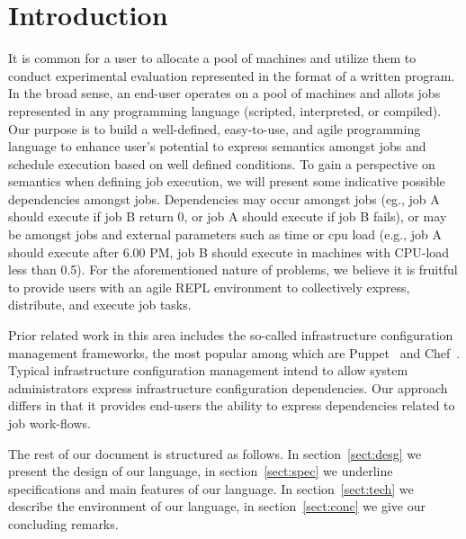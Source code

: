 \section{Introduction}
\label{sect:intro}

It is common for a user to allocate a pool of machines and utilize
them to conduct experimental evaluation represented in the format of
a written program. In the broad sense, an end-user operates on a
pool of machines and allots jobs represented in any programming
language (scripted, interpreted, or compiled). Our purpose is to
build a well-defined, easy-to-use, and agile programming language
to enhance user's potential to express semantics amongst jobs and 
schedule execution based on well defined conditions. To gain a 
perspective on semantics when  defining job  execution, we will 
present some indicative possible dependencies amongst jobs. 
Dependencies may occur amongst jobs (eg., job A should execute if 
job B return 0, or job A should execute if job B fails), or may be 
amongst jobs and external parameters such as time or cpu load (e.g., 
job A should execute after 6.00 PM, job B should execute in machines 
with CPU-load less than 0.5). For the aforementioned nature of 
problems, we believe it is fruitful to provide users with an agile 
REPL environment to collectively express, distribute, and execute 
job tasks.

Prior related work in this area includes the so-called infrastructure 
configuration management frameworks, the most popular among which are 
Puppet~\cite{puppet} and Chef~\cite{chef}. Typical infrastructure 
configuration management intend to allow system  administrators express 
infrastructure configuration dependencies. Our approach differs in that 
it provides end-users the ability to express dependencies related to 
job work-flows. 

The rest of our document is structured as follows. In
section~\ref{sect:desg} we present the design of our language, in
section~\ref{sect:spec} we underline specifications and main
features of our language. In section~\ref{sect:tech} we describe
the environment of our language, in  section~\ref{sect:conc} we
give our concluding remarks.
